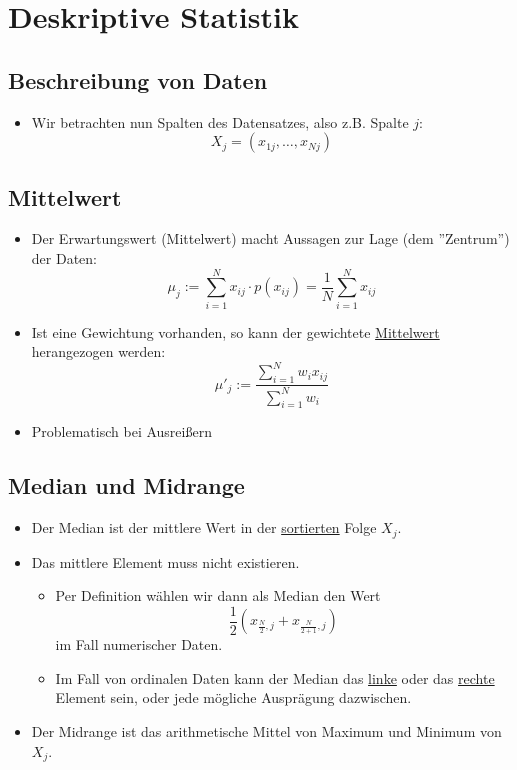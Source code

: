 \documentclass{scrartcl}
\begin{document}
\pagebreak
\section{Deskriptive Statistik}

\subsection{Beschreibung von Daten}

\begin{itemize}
	\item Wir betrachten nun Spalten des Datensatzes, also z.B. Spalte $ j $:
	\[ X_j = (x_{1j},\ldots,x_{Nj}) \]
\end{itemize}

\subsection{Mittelwert}

\begin{itemize}
	\item Der Erwartungswert (Mittelwert) macht Aussagen zur Lage (dem 
	''Zentrum'') der Daten:
	\[ \mu_j := \sum_{i=1}^{N} x_{ij} \cdot p(x_{ij}) = \frac{1}{N} 
	\sum_{i=1}^{N} x_{ij} \]
	\item Ist eine Gewichtung vorhanden, so kann der gewichtete 
	\underline{Mittelwert} herangezogen werden:
	\[ \mu'_j := \frac{\sum_{i=1}^{N} w_i x_{ij}}{\sum_{i=1}^{N} w_i} \]
	\item Problematisch bei Ausreißern
\end{itemize}

\subsection{Median und Midrange}

\begin{itemize}
	\item Der Median ist der mittlere Wert in der \underline{sortierten} Folge 
	$ X_j $.
	\item Das mittlere Element muss nicht existieren.
	\begin{itemize}
		\item Per Definition wählen wir dann als Median den Wert
		\[ \frac{1}{2} (x_{\frac{N}{2},j} + x_{\frac{N}{2+1},j}) \]
		im Fall numerischer Daten.
		\item Im Fall von ordinalen Daten kann der Median das \underline{linke} 
		oder das \underline{rechte} Element sein, oder jede mögliche Ausprägung 
		dazwischen.
	\end{itemize}
	\item Der Midrange ist das arithmetische Mittel von Maximum und Minimum von 
	$ X_j $.
\end{itemize}
\end{document}
